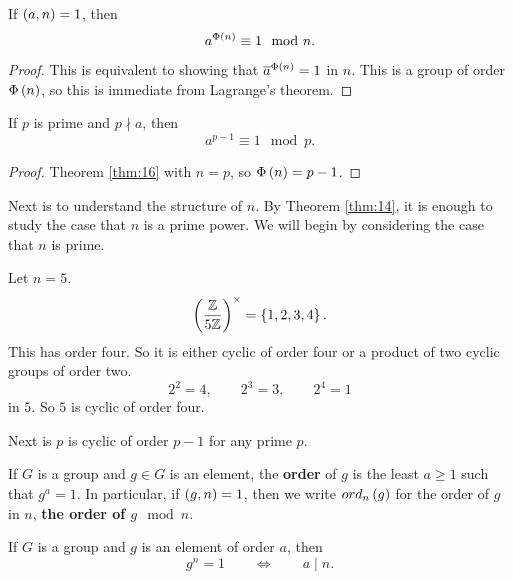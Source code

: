 \begin{theorem}
\label{thm:16}
If $ \br{a, n} = 1 $, then
$$ a^{\Phi\br{n}} \equiv 1 \mod n. $$
\end{theorem}

\begin{proof}
This is equivalent to showing that $ \overline{a}^{\Phi\br{n}} = 1 $ in $ \unit{n} $. This is a group of order $ \Phi\br{n} $, so this is immediate from Lagrange's theorem.
\end{proof}

\begin{corollary}
If $ p $ is prime and $ p \nmid a $, then
$$ a^{p - 1} \equiv 1 \mod p. $$
\end{corollary}

\begin{proof}
Theorem \ref{thm:16} with $ n = p $, so $ \Phi\br{n} = p - 1 $.
\end{proof}

Next is to understand the structure of $ \unit{n} $. By Theorem \ref{thm:14}, it is enough to study the case that $ n $ is a prime power. We will begin by considering the case that $ n $ is prime.

\begin{example*}
Let $ n = 5 $.
$$ \Unit{5} = \cbr{1, 2, 3, 4}. $$
This has order four. So it is either cyclic of order four or a product of two cyclic groups of order two.
$$ 2^2 = 4, \qquad 2^3 = 3, \qquad 2^4 = 1 $$
in $ \unit{5} $. So $ \unit{5} $ is cyclic of order four.
\end{example*}

\pagebreak

Next is $ \unit{p} $ is cyclic of order $ p - 1 $ for any prime $ p $.


\begin{definition}
If $ G $ is a group and $ g \in G $ is an element, the \textbf{order} of $ g $ is the least $ a \ge 1 $ such that $ g^a = 1 $. In particular, if $ \br{g, n} = 1 $, then we write $ ord_n\br{g} $ for the order of $ g $ in $ \unit{n} $, \textbf{the order of $ g \mod n $}.
\end{definition}

\begin{proposition}
\label{prop:19}
If $ G $ is a group and $ g $ is an element of order $ a $, then
$$ g^n = 1 \qquad \iff \qquad a \mid n. $$
\end{proposition}


